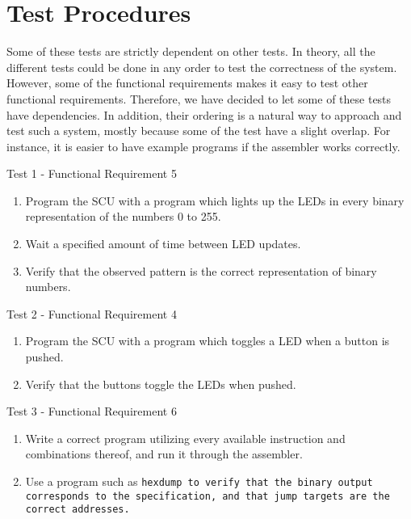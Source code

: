 \section{Test Procedures}

Some of these tests are strictly dependent on other tests. In theory, all the
different tests could be done in any order to test the correctness of the
system. However, some of the functional requirements makes it easy to test other
functional requirements. Therefore, we have decided to let some of these tests
have dependencies. In addition, their ordering is a natural way to approach and
test such a system, mostly because some of the test have a slight overlap. For
instance, it is easier to have example programs if the assembler works
correctly.

{\sc Test 1 - Functional Requirement 5}

{\em \FRV}

\begin{enumerate}
\item Program the \ac{SCU} with a program which lights up the \acp{LED} in every
  binary representation of the numbers 0 to 255.
\item Wait a specified amount of time between \ac{LED} updates.
\begin{comment}
{\sc \color{red}
  TODO: Is this needed?}
yes, else it would be done so fast we couldn't possibly see the results.
\end{comment}
\item Verify that the observed pattern is the correct representation of binary
  numbers.
\end{enumerate}

{\sc Test 2 - Functional Requirement 4}

{\em \FRIV}

\begin{enumerate}
\item Program the \ac{SCU} with a program which toggles a \ac{LED} when a button
  is pushed.
\item Verify that the buttons toggle the \acp{LED} when pushed.
\end{enumerate}

{\sc Test 3 - Functional Requirement 6}

{\em \FRVI}

\begin{enumerate}
\item Write a correct program utilizing every available instruction and
  combinations thereof, and run it through the assembler.
\item Use a program such as \tt{hexdump} to verify that the binary output
  corresponds to the specification, and that jump targets are the correct
  addresses.
\end{enumerate}

